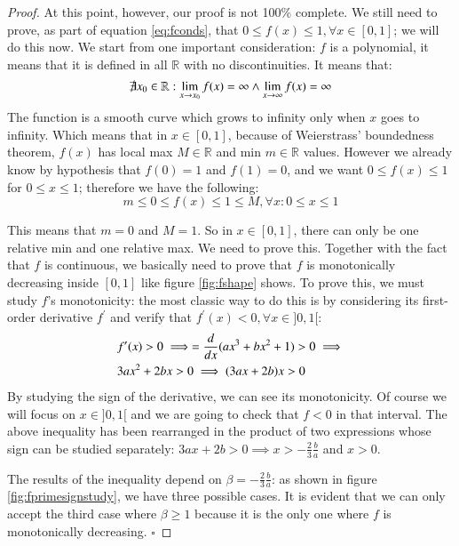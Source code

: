 \begin{proposition}
\begin{proof}
At this point, however, our proof is not 100\% complete. We still need to prove,
as part of equation \ref{eq:fconds}, that 
$0 \leq f(x) \leq 1, \forall x \in [0,1]$; we will do this now. We start from one
important consideration: $f$ is a polynomial, it means that it is defined in all
$\mathbb{R}$ with no discontinuities. It means that:
\begin{equation*}
\not\exists x_0 \in \mathbb{R} : \lim_{x \to x_0} f(x) = \infty \wedge
\lim_{x \to \infty} f(x) = \infty
\end{equation*}
The function is a smooth curve which grows to infinity only when $x$ goes to
infinity. Which means that in $x \in [0,1]$, because of Weierstrass'
boundedness theorem, $f(x)$ has local max $M \in \mathbb{R}$ 
and min $m \in \mathbb{R}$ values. However we already know by hypothesis that
$f(0) = 1$ and $f(1) = 0$, and we want $0 \leq f(x) \leq 1$ for $0 \leq x \leq 1$;
therefore we have the following:
\begin{equation*}
m \leq 0 \leq f(x) \leq 1 \leq M, \forall x : 0 \leq x \leq 1
\end{equation*}
%

%
This means that $m=0$ and $M = 1$. So in $x\in[0,1]$, there can only be one
relative min and one relative max. We need to prove this. Together
with the fact that $f$ is continuous, we basically need to prove that $f$ is
monotonically decreasing inside $[0,1]$ like figure \ref{fig:fshape} shows. To
prove this, we must study $f$'s monotonicity: the most classic way to do this
is by considering its first-order derivative $f^\prime$ and verify that
$f^\prime(x) < 0, \forall x \in ]0,1[$:
\begin{align*}
&f^\prime(x) > 0 \implies = \frac{d}{dx}(ax^3+bx^2+1) > 0 \implies \notag\\
&3ax^2+2bx > 0 \implies (3ax + 2b) x > 0
\end{align*}
By studying the sign of the derivative, we can see its monotonicity. Of course we will
focus on $x\in]0,1[$ and we are going to check that $f < 0$ in that interval. The above
inequality has been rearranged in the product of two expressions whose sign can be
studied separately: $3ax + 2b > 0 \implies x > -\frac{2}{3}\frac{b}{a}$ and $x > 0$.
%

%
The results of the inequality depend on $\beta = -\frac{2}{3}\frac{b}{a}$: as shown
in figure \ref{fig:fprimesignstudy}, we have three possible cases. It is evident that we
can only accept the third case where $\beta \geq 1$ because it is the only one
where $f$ is monotonically decreasing.
$\square$
\end{proof}
\end{proposition}
